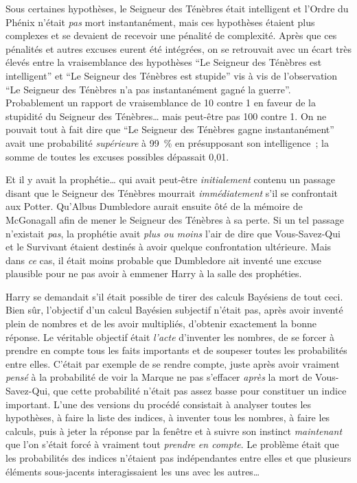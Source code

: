 Sous certaines hypothèses, le Seigneur des Ténèbres était intelligent et l'Ordre du Phénix n'était \emph{pas} mort instantanément, mais ces hypothèses étaient plus complexes et se devaient de recevoir une pénalité de complexité. Après que ces pénalités et autres excuses eurent été intégrées, on se retrouvait avec un écart très élevés entre la vraisemblance des hypothèses “Le Seigneur des Ténèbres est intelligent” et “Le Seigneur des Ténèbres est stupide” vis à vis de l'observation “Le Seigneur des Ténèbres n'a pas instantanément gagné la guerre”. Probablement un rapport de vraisemblance de 10 contre 1 en faveur de la stupidité du Seigneur des Ténèbres… mais peut-être pas 100 contre 1. On ne pouvait tout à fait dire que “Le Seigneur des Ténèbres gagne instantanément” avait une probabilité \emph{supérieure} à 99~\% en présupposant son intelligence~; la somme de toutes les excuses possibles dépassait 0,01.

Et il y avait la prophétie… qui avait peut-être \emph{initialement} contenu un passage disant que le Seigneur des Ténèbres mourrait \emph{immédiatement} s'il se confrontait aux Potter. Qu'Albus Dumbledore aurait ensuite ôté de la mémoire de McGonagall afin de mener le Seigneur des Ténèbres à sa perte. Si un tel passage n'existait \emph{pas}, la prophétie avait \emph{plus ou moins} l'air de dire que Vous-Savez-Qui et le Survivant étaient destinés à avoir quelque confrontation ultérieure. Mais dans \emph{ce} cas, il était moins probable que Dumbledore ait inventé une excuse plausible pour ne pas avoir à emmener Harry à la salle des prophéties.

Harry se demandait s'il était possible de tirer des calculs Bayésiens de tout ceci. Bien sûr, l'objectif d'un calcul Bayésien subjectif n'était pas, après avoir inventé plein de nombres et de les avoir multipliés, d'obtenir exactement la bonne réponse. Le véritable objectif était \emph{l'acte} d'inventer les nombres, de se forcer à prendre en compte tous les faits importants et de soupeser toutes les probabilités entre elles. C'était par exemple de se rendre compte, juste après avoir vraiment \emph{pensé} à la probabilité de voir la Marque ne pas s'effacer \emph{après} la mort de Vous-Savez-Qui, que cette probabilité n'était pas assez basse pour constituer un indice important. L'une des versions du procédé consistait à analyser toutes les hypothèses, à faire la liste des indices, à inventer tous les nombres, à faire les calculs, puis à jeter la réponse par la fenêtre et à suivre son instinct \emph{maintenant} que l'on s'était forcé à vraiment tout \emph{prendre en compte}. Le problème était que les probabilités des indices n'étaient pas indépendantes entre elles et que plusieurs éléments sous-jacents interagissaient les uns avec les autres…


